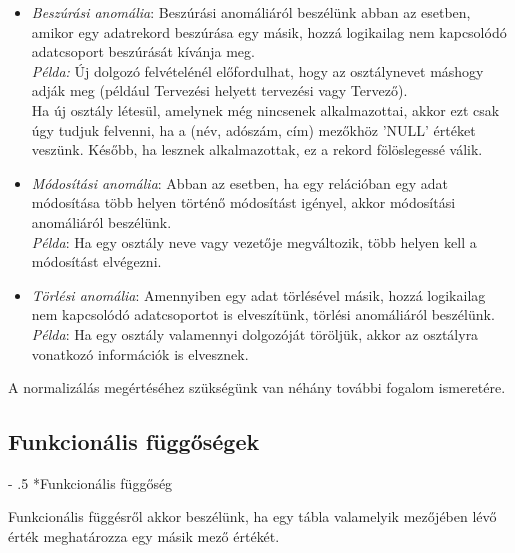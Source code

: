 \documentclass[tikz,12pt,margin=0px]{article}
\makeatletter
\renewcommand\paragraph{%
	\@startsection{paragraph}{4}{0mm}%
	{-\baselineskip}%
	{.5\baselineskip}%
	{\normalfont\normalsize\bfseries}}
\makeatother
\begin{document}
    \begin{itemize}
        \item \emph{Beszúrási anomália}: Beszúrási anomáliáról beszélünk abban az esetben, amikor egy adatrekord beszúrása egy másik, hozzá logikailag nem kapcsolódó adatcsoport beszúrását kívánja meg.\\

            \emph{Példa:}
            Új dolgozó felvételénél előfordulhat, hogy az osztálynevet máshogy adják meg (például Tervezési helyett tervezési vagy Tervező).\\
            Ha új osztály létesül, amelynek még nincsenek alkalmazottai, akkor ezt csak úgy tudjuk felvenni, ha a (név, adószám, cím) mezőkhöz 'NULL' értéket veszünk. Később, ha lesznek alkalmazottak, ez a rekord fölöslegessé válik.
        \item \emph{Módosítási anomália}: Abban az esetben, ha egy relációban egy adat módosítása több helyen történő módosítást igényel, akkor módosítási anomáliáról beszélünk.\\

            \emph{Példa}: Ha egy osztály neve vagy vezetője megváltozik, több helyen kell a módosítást elvégezni.
        \item \emph{Törlési anomália}: Amennyiben egy adat törlésével másik, hozzá logikailag nem kapcsolódó adatcsoportot is elveszítünk, törlési anomáliáról beszélünk.\\

            \emph{Példa}: Ha egy osztály valamennyi dolgozóját töröljük, akkor az osztályra vonatkozó információk is elvesznek.
    \end{itemize}

    \noindent A normalizálás megértéséhez szükségünk van néhány további fogalom ismeretére.\\

	\subsection*{Funkcionális függőségek\\}

    \paragraph*{Funkcionális függőség\\}

    Funkcionális függésről akkor beszélünk, ha egy tábla valamelyik mezőjében lévő érték meghatározza egy másik mező értékét.\\
\end{document}
